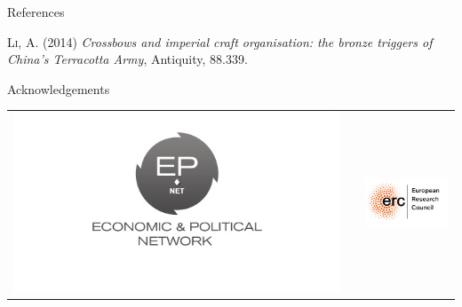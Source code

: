 \documentclass[final]{beamer}
\newlength{\onecolwid}
\begin{document}
\begin{frame}[t]
\begin{columns}[t]
\begin{column}{\onecolwid}
\begin{block}{References}
\begin{thebibliography}{50}
\textsc{Li, A. (2014)}
\textit{Crossbows and imperial craft organisation: the bronze triggers of China's Terracotta Army}, Antiquity, 88.339.

\end{thebibliography}

\end{block}



\begin{block}{Acknowledgements}

\small{}

\end{block}




\begin{center}
\begin{tabular}{ccc}
\includegraphics[width=0.4\linewidth]{images/epnet.png} & \hfill & \includegraphics[width=0.4\linewidth]{images/erc.png}
\end{tabular}
\end{center}


\end{column} %

\end{columns} %

\end{frame} %
\end{document}
